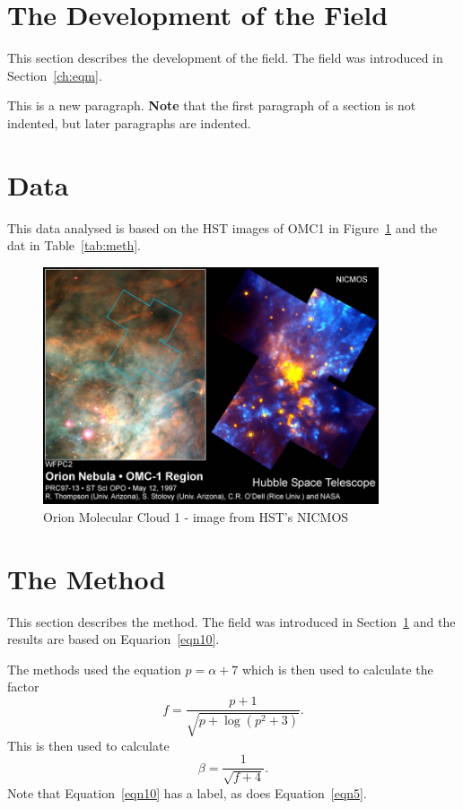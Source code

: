 \documentclass[twoside, fontsize=12pt,
     bibliography=totoc, %
     listof=totoc, %
     index=totoc, %
     onehalfspacing %
]{_MScDiss2017_cls}
\begin{document}
\section{The Development of the Field}
\label{sec_devel}
This section describes the development of the  field. The field was introduced in Section~\ref{ch:eqm}.

This is a new paragraph. {\normalfont\bfseries Note} that the first paragraph of a 
section is not indented, but later paragraphs are indented. 

\section{Data}
\label{sec:data}
This data analysed is based on the  HST images of OMC1 in Figure~\ref{orion_pic} and the dat in Table~\ref{tab:meth}. 
\begin{figure}[hbtp]
\begin{center}
 \includegraphics[height=70mm]{fig-omc1nic}
 \caption {Orion Molecular Cloud 1 - image from HST's NICMOS}
 \label{orion_pic}
\end{center}
\end{figure}
\section{The Method}
\label{sec_method}
This section describes the method. The field was introduced in Section~\ref{sec_devel} 
and the results are based on Equarion~\ref{eqn10}. 

The methods used the equation $p = \alpha + 7$ which is then used 
to calculate the factor 
\begin{equation}
 f = \frac{p+1}{ \sqrt{ p + \log( p^2 + 3 ) } }  . 
 \label{eqn10}
\end{equation}
This is then used to calculate 
\begin{equation}
 \beta = \frac{1}{ \sqrt{ f + 4 } } .
 \label{eqn5}
\end{equation}
Note that Equation~\ref{eqn10} has a label, as does Equation~\ref{eqn5}. 
\end{document}
